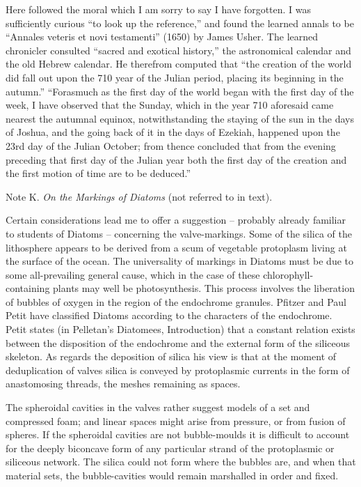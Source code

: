 \documentclass[a4paper, 12pt, oneside]{article}
\begin{document}
Here followed the moral which I am sorry to say I have forgotten. I was sufficiently curious ``to look up the reference,'' and found the learned annals to be ``Annales veteris et novi testamenti'' (1650) by James Usher. The learned chronicler consulted ``sacred and exotical history,'' the astronomical calendar and the old Hebrew calendar. He therefrom computed that ``the creation of the world did fall out upon the 710 year of the Julian period, placing its beginning in the autumn.'' ``Forasmuch as the first day of the world began with the first day of the week, I have observed that the Sunday, which in the year 710 aforesaid came nearest the autumnal equinox, notwithstanding the staying of the sun in the days of Joshua, and the going back of it in the days of Ezekiah, happened upon the 23rd day of the Julian October; from thence concluded that from the evening preceding that first day of the Julian year both the first day of the creation and the first motion of time are to be deduced.''

Note K. \emph{On the Markings of Diatoms} (not referred to in text).

Certain considerations lead me to offer a suggestion -- probably already familiar to students of Diatoms -- concerning the valve-markings. Some of the silica of the lithosphere appears to be derived from a scum of vegetable protoplasm living at the surface of the ocean. The universality of markings in Diatoms must be due to some all-prevailing general cause, which in the case of these chlorophyll-containing plants may well be photosynthesis. This process involves the liberation of bubbles of oxygen in the region of the endochrome granules. Pfitzer and Paul Petit have classified Diatoms according to the characters of the endochrome. Petit states (in Pelletan's Diatomees, Introduction) that a constant relation exists between the disposition of the endochrome and the external form of the siliceous skeleton. As regards the deposition of silica his view is that at the moment of deduplication of valves silica is conveyed by protoplasmic currents in the form of anastomosing threads, the meshes remaining as spaces.

The spheroidal cavities in the valves rather suggest models of a set and compressed foam; and linear spaces might arise from pressure, or from fusion of spheres. If the spheroidal cavities are not bubble-moulds it is difficult to account for the deeply biconcave form of any particular strand of the protoplasmic or siliceous network. The silica could not form where the bubbles are, and when that material sets, the bubble-cavities would remain marshalled in order and fixed.
\end{document}
